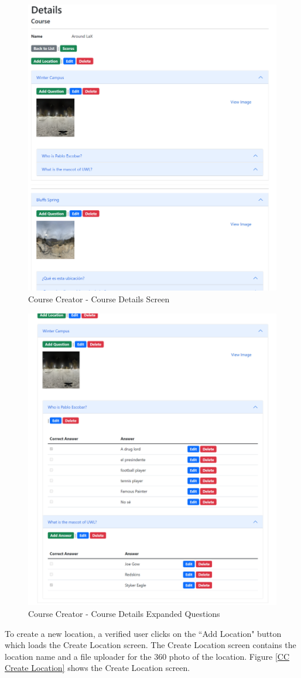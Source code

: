 \begin{figure}[htb]
	\centering
	\includegraphics[width=.6\textwidth]{Requirements/assets/cc-course-dashboard.png}
	\caption[Course Creator - Course Details Screen]{\label{CC Course Dashboard}Course Creator - Course Details Screen}
\end{figure}
\begin{figure}[htb]
	\centering
	\includegraphics[width=.6\textwidth]{Requirements/assets/cc-questions-expanded.png}
	\caption[Course Creator - Course Details Expanded Questions]{\label{CC Expanded}Course Creator - Course Details Expanded Questions}
\end{figure}
To create a new location, a verified user clicks on the ``Add Location" button which loads the Create Location screen. The Create Location screen contains the location name and a file uploader for the 360 photo of the location. Figure \ref{CC Create Location} shows the Create Location screen.
